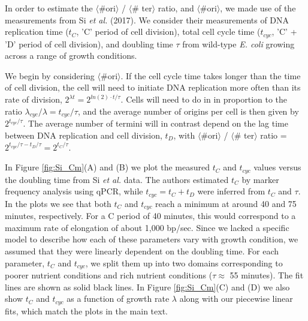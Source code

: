 In order to estimate the $\langle$\#ori$\rangle$ / $\langle$\# ter$\rangle$
ratio, and $\langle$\#ori$\rangle$, we made use of the measurements  from   Si
\textit{et al.} (2017). We consider their measurements of DNA replication time
($t_{C}$, 'C' period of  cell division), total cell cycle time ($t_{cyc}$, 'C' +
'D' period of cell division), and doubling time $\tau$ from wild-type \textit{E.
coli} growing across a range of growth conditions.

We begin by considering $\langle$\#ori$\rangle$. If the cell cycle time takes
longer  than the time of cell division, the cell will need to initiate DNA
replication  more often than its rate of division, $2^{\lambda t} = 2^{ln(2)
\cdot t/ \tau}$. Cells will need to do in in proportion to the ratio
$\lambda_{cyc} / \lambda =  t_{cyc}/\tau$, and the average number of origins per
cell is then given by $2^{t_{cyc}/ \tau}$.  The average number of termini will
in contrast depend on the lag time between  DNA replication and cell division,
$t_{D}$, with $\langle$\#ori$\rangle$ / $\langle$\# ter$\rangle$ ratio =
$2^{t_{cyc}/ \tau - t_{D}/ \tau} =  2^{t_{C}/ \tau}$.

In Figure \ref{fig:Si_Cm}(A) and (B) we plot the measured $t_{C}$ and $t_{cyc}$ values
versus the doubling time from Si \textit{et al.} data. The authors estimated
$t_{C}$ by marker frequency analysis using qPCR, while  $t_{cyc} = t_{C} +
t_{D}$ were inferred from $t_{C}$ and $\tau$. In the plots we see that both
$t_{C}$ and $t_{cyc}$ reach a minimum  at around 40 and 75 minutes,
respectively. For a C period of 40 minutes, this would correspond to a maximum
rate of elongation of about 1,000 bp/sec. Since we lacked a specific model to
describe how each of these parameters vary with growth condition, we assumed
that they were linearly dependent on the doubling time. For each parameter,
$t_{C}$ and $t_{cyc}$, we split them up into two domains corresponding to poorer
nutrient conditions and rich nutrient conditions ($\tau \approx$ 55 minutes).
The fit lines are shown as solid black lines. In Figure \ref{fig:Si_Cm}(C) and (D) we also
show $t_{C}$ and $t_{cyc}$ as a function of growth rate $\lambda$ along with our
piecewise linear fits, which match the plots in the main text.


